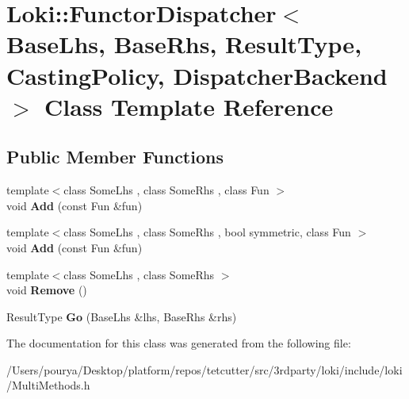 \hypertarget{classLoki_1_1FunctorDispatcher}{}\section{Loki\+:\+:Functor\+Dispatcher$<$ Base\+Lhs, Base\+Rhs, Result\+Type, Casting\+Policy, Dispatcher\+Backend $>$ Class Template Reference}
\label{classLoki_1_1FunctorDispatcher}
\subsection*{Public Member Functions}
\begin{DoxyCompactItemize}
\item 
\hypertarget{classLoki_1_1FunctorDispatcher_a132e668fa810a2e006450ba8db2b72a7}{}{\footnotesize template$<$class Some\+Lhs , class Some\+Rhs , class Fun $>$ }\\void {\bfseries Add} (const Fun \&fun)\label{classLoki_1_1FunctorDispatcher_a132e668fa810a2e006450ba8db2b72a7}

\item 
\hypertarget{classLoki_1_1FunctorDispatcher_a3088c4b89f47a2ef635cd91f06e77c4d}{}{\footnotesize template$<$class Some\+Lhs , class Some\+Rhs , bool symmetric, class Fun $>$ }\\void {\bfseries Add} (const Fun \&fun)\label{classLoki_1_1FunctorDispatcher_a3088c4b89f47a2ef635cd91f06e77c4d}

\item 
\hypertarget{classLoki_1_1FunctorDispatcher_a474a2c839cb4a03b3f7320b1d3fc1fe6}{}{\footnotesize template$<$class Some\+Lhs , class Some\+Rhs $>$ }\\void {\bfseries Remove} ()\label{classLoki_1_1FunctorDispatcher_a474a2c839cb4a03b3f7320b1d3fc1fe6}

\item 
\hypertarget{classLoki_1_1FunctorDispatcher_a2a5aca4fef3d5d247654f9ea0f85e81b}{}Result\+Type {\bfseries Go} (Base\+Lhs \&lhs, Base\+Rhs \&rhs)\label{classLoki_1_1FunctorDispatcher_a2a5aca4fef3d5d247654f9ea0f85e81b}

\end{DoxyCompactItemize}


The documentation for this class was generated from the following file\+:\begin{DoxyCompactItemize}
\item 
/\+Users/pourya/\+Desktop/platform/repos/tetcutter/src/3rdparty/loki/include/loki/Multi\+Methods.\+h\end{DoxyCompactItemize}
